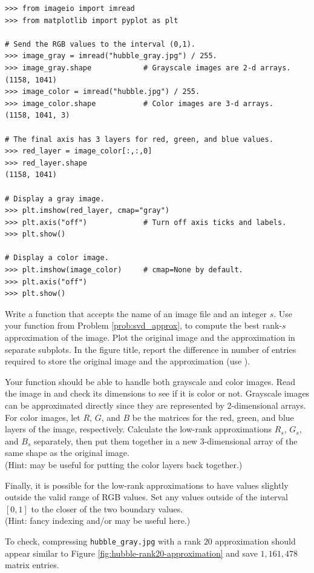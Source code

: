 \begin{lstlisting}
>>> from imageio import imread
>>> from matplotlib import pyplot as plt

# Send the RGB values to the interval (0,1).
>>> image_gray = imread("hubble_gray.jpg") / 255.
>>> image_gray.shape            # Grayscale images are 2-d arrays.
(1158, 1041)
>>> image_color = imread("hubble.jpg") / 255.
>>> image_color.shape           # Color images are 3-d arrays.
(1158, 1041, 3)

# The final axis has 3 layers for red, green, and blue values.
>>> red_layer = image_color[:,:,0]
>>> red_layer.shape
(1158, 1041)

# Display a gray image.
>>> plt.imshow(red_layer, cmap="gray")
>>> plt.axis("off")             # Turn off axis ticks and labels.
>>> plt.show()

# Display a color image.
>>> plt.imshow(image_color)     # cmap=None by default.
>>> plt.axis("off")
>>> plt.show()
\end{lstlisting}

\begin{problem} %
Write a function that accepts the name of an image file and an integer $s$.
Use your function from Problem \ref{prob:svd_approx}, to compute the best rank-$s$ approximation of the image.
Plot the original image and the approximation in separate subplots.
In the figure title, report the difference in number of entries required to store the original image and the approximation (use ).

Your function should be able to handle both grayscale and color images.
Read the image in and check its dimensions to see if it is color or not.
Grayscale images can be approximated directly since they are represented by 2-dimensional arrays.
For color images, let $R$, $G$, and $B$ be the matrices for the red, green, and blue layers of the image, respectively.
Calculate the low-rank approximations $R_s$, $G_s$, and $B_s$ separately, then put them together in a new 3-dimensional array of the same shape as the original image.
\\ (Hint:  may be useful for putting the color layers back together.)

Finally, it is possible for the low-rank approximations to have values slightly outside the valid range of RGB values.
Set any values outside of the interval $[0,1]$ to the closer of the two boundary values.
\\ (Hint: fancy indexing and/or  may be useful here.)

To check, compressing \texttt{hubble\_gray.jpg} with a rank $20$ approximation should appear similar to Figure \ref{fig:hubble-rank20-approximation} and save $1,161,478$ matrix entries.
\end{problem}

